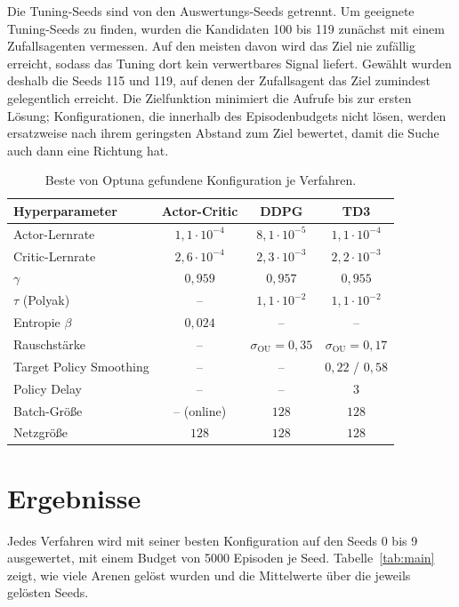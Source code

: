 \documentclass[11pt,a4paper]{article}
\begin{document}
Die Tuning-Seeds sind von den Auswertungs-Seeds getrennt. Um geeignete Tuning-Seeds zu finden,
wurden die Kandidaten 100 bis 119 zunächst mit einem Zufallsagenten vermessen. Auf den meisten
davon wird das Ziel nie zufällig erreicht, sodass das Tuning dort kein verwertbares Signal
liefert. Gewählt wurden deshalb die Seeds 115 und 119, auf denen der Zufallsagent das Ziel
zumindest gelegentlich erreicht. Die Zielfunktion minimiert die Aufrufe bis zur ersten Lösung;
Konfigurationen, die innerhalb des Episodenbudgets nicht lösen, werden ersatzweise nach ihrem
geringsten Abstand zum Ziel bewertet, damit die Suche auch dann eine Richtung hat.

\begin{table}[h]
\centering
\small
\caption{Beste von Optuna gefundene Konfiguration je Verfahren.}
\label{tab:hyper}
\begin{tabular}{lccc}
\toprule
Hyperparameter & Actor-Critic & DDPG & TD3 \\
\midrule
Actor-Lernrate       & $1{,}1\!\cdot\!10^{-4}$ & $8{,}1\!\cdot\!10^{-5}$ & $1{,}1\!\cdot\!10^{-4}$ \\
Critic-Lernrate      & $2{,}6\!\cdot\!10^{-4}$ & $2{,}3\!\cdot\!10^{-3}$ & $2{,}2\!\cdot\!10^{-3}$ \\
$\gamma$             & $0{,}959$ & $0{,}957$ & $0{,}955$ \\
$\tau$ (Polyak)      & --       & $1{,}1\!\cdot\!10^{-2}$ & $1{,}1\!\cdot\!10^{-2}$ \\
Entropie $\beta$     & $0{,}024$ & -- & -- \\
Rauschstärke         & --       & $\sigma_{\text{OU}}=0{,}35$ & $\sigma_{\text{OU}}=0{,}17$ \\
Target Policy Smoothing & --    & -- & $0{,}22$ / $0{,}58$ \\
Policy Delay         & --       & -- & $3$ \\
Batch-Größe          & -- (online) & $128$ & $128$ \\
Netzgröße            & $128$    & $128$ & $128$ \\
\bottomrule
\end{tabular}
\end{table}

\section{Ergebnisse}
Jedes Verfahren wird mit seiner besten Konfiguration auf den Seeds 0 bis 9 ausgewertet, mit
einem Budget von 5000 Episoden je Seed. Tabelle~\ref{tab:main} zeigt, wie viele Arenen gelöst
wurden und die Mittelwerte über die jeweils gelösten Seeds.
\end{document}
